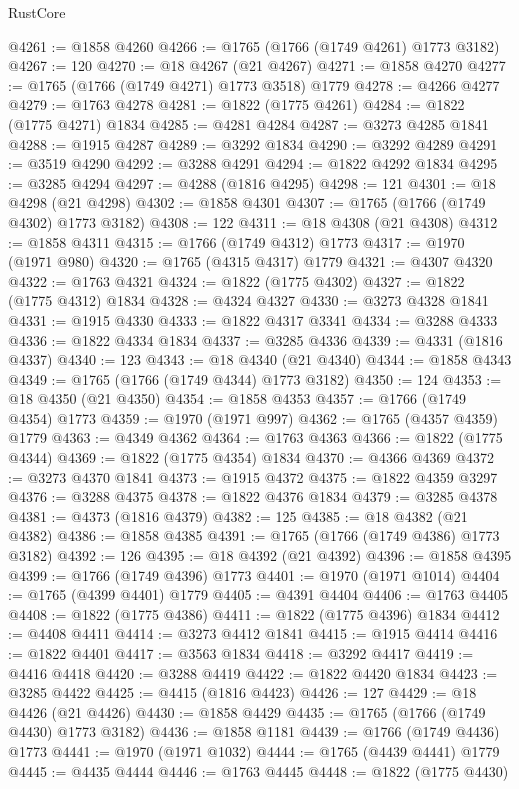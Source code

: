 \begin{lexlean}{RustCore}
\begin{coremodule}
@4261 := @1858 @4260
@4266 := @1765 (@1766 (@1749 @4261) @1773 @3182)
@4267 := 120
@4270 := @18 @4267 (@21 @4267)
@4271 := @1858 @4270
@4277 := @1765 (@1766 (@1749 @4271) @1773 @3518) @1779
@4278 := @4266 @4277
@4279 := @1763 @4278
@4281 := @1822 (@1775 @4261)
@4284 := @1822 (@1775 @4271) @1834
@4285 := @4281 @4284
@4287 := @3273 @4285 @1841
@4288 := @1915 @4287
@4289 := @3292 @1834
@4290 := @3292 @4289
@4291 := @3519 @4290
@4292 := @3288 @4291
@4294 := @1822 @4292 @1834
@4295 := @3285 @4294
@4297 := @4288 (@1816 @4295)
@4298 := 121
@4301 := @18 @4298 (@21 @4298)
@4302 := @1858 @4301
@4307 := @1765 (@1766 (@1749 @4302) @1773 @3182)
@4308 := 122
@4311 := @18 @4308 (@21 @4308)
@4312 := @1858 @4311
@4315 := @1766 (@1749 @4312) @1773
@4317 := @1970 (@1971 @980)
@4320 := @1765 (@4315 @4317) @1779
@4321 := @4307 @4320
@4322 := @1763 @4321
@4324 := @1822 (@1775 @4302)
@4327 := @1822 (@1775 @4312) @1834
@4328 := @4324 @4327
@4330 := @3273 @4328 @1841
@4331 := @1915 @4330
@4333 := @1822 @4317 @3341
@4334 := @3288 @4333
@4336 := @1822 @4334 @1834
@4337 := @3285 @4336
@4339 := @4331 (@1816 @4337)
@4340 := 123
@4343 := @18 @4340 (@21 @4340)
@4344 := @1858 @4343
@4349 := @1765 (@1766 (@1749 @4344) @1773 @3182)
@4350 := 124
@4353 := @18 @4350 (@21 @4350)
@4354 := @1858 @4353
@4357 := @1766 (@1749 @4354) @1773
@4359 := @1970 (@1971 @997)
@4362 := @1765 (@4357 @4359) @1779
@4363 := @4349 @4362
@4364 := @1763 @4363
@4366 := @1822 (@1775 @4344)
@4369 := @1822 (@1775 @4354) @1834
@4370 := @4366 @4369
@4372 := @3273 @4370 @1841
@4373 := @1915 @4372
@4375 := @1822 @4359 @3297
@4376 := @3288 @4375
@4378 := @1822 @4376 @1834
@4379 := @3285 @4378
@4381 := @4373 (@1816 @4379)
@4382 := 125
@4385 := @18 @4382 (@21 @4382)
@4386 := @1858 @4385
@4391 := @1765 (@1766 (@1749 @4386) @1773 @3182)
@4392 := 126
@4395 := @18 @4392 (@21 @4392)
@4396 := @1858 @4395
@4399 := @1766 (@1749 @4396) @1773
@4401 := @1970 (@1971 @1014)
@4404 := @1765 (@4399 @4401) @1779
@4405 := @4391 @4404
@4406 := @1763 @4405
@4408 := @1822 (@1775 @4386)
@4411 := @1822 (@1775 @4396) @1834
@4412 := @4408 @4411
@4414 := @3273 @4412 @1841
@4415 := @1915 @4414
@4416 := @1822 @4401
@4417 := @3563 @1834
@4418 := @3292 @4417
@4419 := @4416 @4418
@4420 := @3288 @4419
@4422 := @1822 @4420 @1834
@4423 := @3285 @4422
@4425 := @4415 (@1816 @4423)
@4426 := 127
@4429 := @18 @4426 (@21 @4426)
@4430 := @1858 @4429
@4435 := @1765 (@1766 (@1749 @4430) @1773 @3182)
@4436 := @1858 @1181
@4439 := @1766 (@1749 @4436) @1773
@4441 := @1970 (@1971 @1032)
@4444 := @1765 (@4439 @4441) @1779
@4445 := @4435 @4444
@4446 := @1763 @4445
@4448 := @1822 (@1775 @4430)

\end{coremodule}
\end{lexlean}
